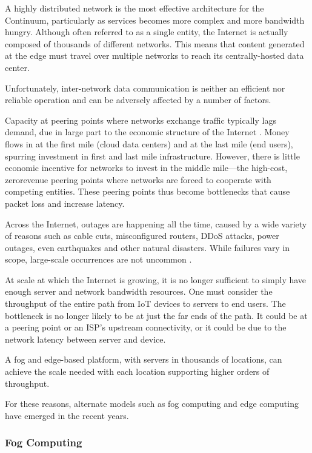 \documentclass{ieeeaccess}
\begin{document}
A highly distributed network is the most effective architecture for the Continuum, particularly as services becomes more complex and more bandwidth hungry. Although often referred to as a single entity, the Internet is actually composed of thousands of different networks. This means that content generated at the edge must travel over multiple networks to reach its centrally-hosted data center.

Unfortunately, inter-network data communication is neither an efficient nor reliable operation and can be adversely affected by a number of factors.

Capacity at peering points where networks exchange traffic typically lags demand, due in large part to the economic structure of the Internet \cite{akamai}. Money flows in at the first mile (cloud data centers) and at the last mile (end users), spurring investment in first and last mile infrastructure. However, there is little economic incentive for networks to invest in the middle mile—the high-cost, zerorevenue peering points where networks are forced to cooperate with competing entities. These peering points thus become bottlenecks that cause packet loss and increase latency.

Across the Internet, outages are happening all the time, caused by a wide variety of reasons such as cable cuts, misconfigured routers, DDoS attacks, power outages, even earthquakes and other natural disasters. While failures vary in scope, large-scale occurrences are not uncommon \cite{aws-outage}.

At scale at which the Internet is growing, it is no longer sufficient to simply have enough server and network bandwidth resources. One must consider the throughput of the entire path from IoT devices to servers to end users. The bottleneck is no longer likely to be at just the far ends of the path. It could be at a peering point or an ISP’s upstream connectivity, or it could be due to the network latency between server and device. 

A fog and edge-based platform, with servers in thousands of locations, can achieve the scale needed with each location supporting higher orders of throughput.

For these reasons, alternate models such as fog computing and edge computing have emerged in the recent years.

\subsubsection{Fog Computing}
\end{document}
